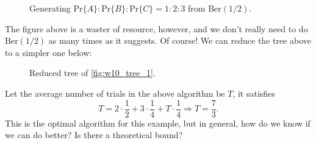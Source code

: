 \begin{figure}[H]
    \centering
    \caption{Generating $\mathrm{Pr}\{A\}:\mathrm{Pr}\{B\}:\mathrm{Pr}\{C\} = 1:2:3$ from $\mathrm{Ber}(1/2)$.}
    \label{fig:w10_tree_1}
\end{figure}

The figure above is a waster of resource, however, and we don't really need to do $\mathrm{Ber}(1/2)$ as many times as it suggests. Of course! We can reduce the tree above to a simpler one below:
\begin{figure}[H]
    \centering
    \caption{Reduced tree of \autoref{fig:w10_tree_1}.}
\end{figure}

Let the average number of trials in the above algorithm be $T$, it satisfies
\begin{equation*}
    T = 2\cdot \frac{1}{2} + 3\cdot \frac{1}{4} + 
    T\cdot\frac{1}{4} \Rightarrow T= \frac{7}{3}.
\end{equation*}
This is the optimal algorithm for this example, but in general, how do we know if we can do better? Is there a theoretical bound?

